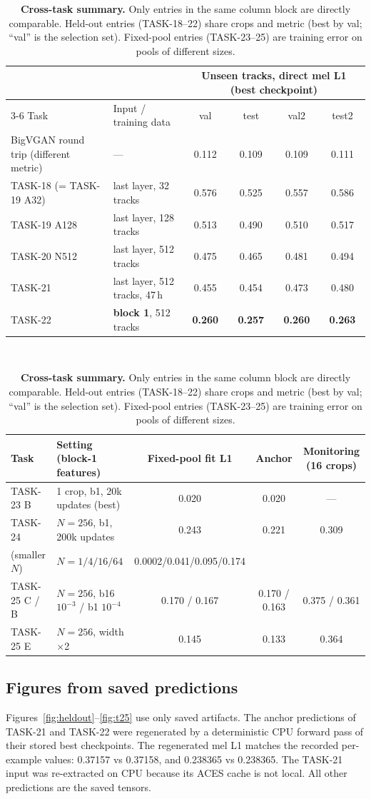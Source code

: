 \documentclass[10pt,letterpaper]{article}
\begin{document}
\begin{table}[t]
\centering\footnotesize
\caption{\textbf{Cross-task summary.} Only entries in the same column block are directly comparable. Held-out entries (TASK-18--22) share crops and metric (best by val; ``val'' is the selection set). Fixed-pool entries (TASK-23--25) are training error on pools of different sizes.}
\label{tab:cross}
\begin{tabular}{@{}llcccc@{}}
\toprule
& & \multicolumn{4}{c}{Unseen tracks, direct mel L1 (best checkpoint)}\\
\cmidrule(lr){3-6}
Task & Input / training data & val & test & val2 & test2\\
\midrule
BigVGAN round trip (different metric) & --- & 0.112 & 0.109 & 0.109 & 0.111\\
TASK-18 (= TASK-19 A32) & last layer, 32 tracks & 0.576 & 0.525 & 0.557 & 0.586\\
TASK-19 A128 & last layer, 128 tracks & 0.513 & 0.490 & 0.510 & 0.517\\
TASK-20 N512 & last layer, 512 tracks & 0.475 & 0.465 & 0.481 & 0.494\\
TASK-21 & last layer, 512 tracks, 47\,h & 0.455 & 0.454 & 0.473 & 0.480\\
TASK-22 & \textbf{block 1}, 512 tracks & \textbf{0.260} & \textbf{0.257} & \textbf{0.260} & \textbf{0.263}\\
\bottomrule
\end{tabular}\\[6pt]
\begin{tabular}{@{}llccc@{}}
\toprule
Task & Setting (block-1 features) & Fixed-pool fit L1 & Anchor & Monitoring (16 crops)\\
\midrule
TASK-23 B & 1 crop, b1, 20k updates (best) & 0.020 & 0.020 & ---\\
TASK-24 & $N{=}256$, b1, 200k updates & 0.243 & 0.221 & 0.309\\
\quad (smaller $N$) & $N{=}1/4/16/64$ & 0.0002/0.041/0.095/0.174 & & \\
TASK-25 C / B & $N{=}256$, b16 $10^{-3}$ / b1 $10^{-4}$ & 0.170 / 0.167 & 0.170 / 0.163 & 0.375 / 0.361\\
TASK-25 E & $N{=}256$, width $\times$2 & 0.145 & 0.133 & 0.364\\
\bottomrule
\end{tabular}
\end{table}

\subsection{Figures from saved predictions}
\label{sec:figs}
Figures~\ref{fig:heldout}--\ref{fig:t25} use only saved artifacts. The anchor predictions of TASK-21 and TASK-22 were regenerated by a deterministic CPU forward pass of their stored best checkpoints. The regenerated mel L1 matches the recorded per-example values: 0.37157 vs 0.37158, and 0.238365 vs 0.238365. The TASK-21 input was re-extracted on CPU because its ACES cache is not local. All other predictions are the saved tensors.
\end{document}

